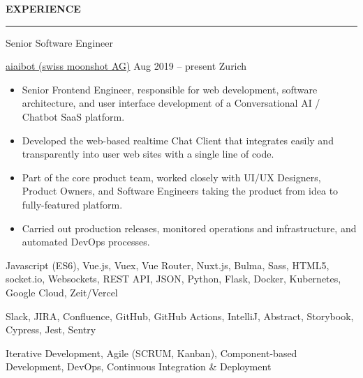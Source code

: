 \documentclass[11pt, a4paper, ragged2e, withhyper]{altacv}
\renewcommand{\cvsectionfont}{\Large\sffamily\bfseries}
\renewcommand{\cvevent}[4]{%
  {\Large\color{emphasis}#1\par}
  \medskip\normalsize
  \ifstrequal{#2}{}{}{
  	{#2}}
  \ifstrequal{#3}{}{}{{
  	\hspace{0.5em}
  	{#3}}}
  \ifstrequal{#4}{}{}{{
  	\hspace{0.5em}
  	{#4}}}\par
  \medskip\normalsize
}
\renewcommand{\cvsection}[2][]{%
  \bigskip%
  \ifstrequal{#1}{}{}{\marginpar{\vspace*{\dimexpr1pt-\baselineskip}\raggedright}}%
  {\color{heading}\cvsectionfont\MakeUppercase{#2}}\\%
  {\color{headingrule}\rule{\linewidth}{0.5pt}\par}\bigskip
}
\begin{document}
	
\pagestyle{default}
\makecvheader

\setlength{\columnsep}{30pt}

\begin{paracol}{2}


	\cvsection{Experience}
	
	\cvevent{Senior Software Engineer}{\href{https://www.aiaibot.com/}{aiaibot (swiss moonshot AG)}}{Aug 2019 -- present}{Zurich}

	\bigskip
	\begin{itemize}[label=\color{bullet}\textbullet]
		\item Senior Frontend Engineer, responsible for web development, software architecture, and user interface development of a Conversational AI / Chatbot SaaS platform.
		\item Developed the web-based realtime Chat Client that integrates easily and transparently into user web sites with a single line of code.
		\item Part of the core product team, worked closely with UI/UX Designers, Product Owners, and Software Engineers taking the product from idea to fully-featured platform.
		\item Carried out production releases, monitored operations and infrastructure, and automated DevOps processes.
	\end{itemize}

	\bigskip
	\begin{description}
		\small
		\item [Technologies:] Javascript (ES6), Vue.js, Vuex, Vue Router, Nuxt.js, Bulma, Sass, HTML5, socket.io, Websockets, REST API, JSON, Python, Flask, Docker, Kubernetes, Google Cloud, Zeit/Vercel\smallskip
		\item [Tools:] Slack, JIRA, Confluence, GitHub, GitHub Actions, IntelliJ, Abstract, Storybook, Cypress, Jest, Sentry\smallskip
		\item [Methodologies:] Iterative Development, Agile (SCRUM, Kanban), Component-based Development, DevOps, Continuous Integration \& Deployment
	\end{description}


\end{paracol}
\end{document}
